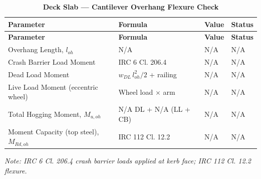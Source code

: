 \documentclass[12pt,a4paper]{report}
\numberwithin{table}{chapter}
\numberwithin{figure}{chapter}
\newcommand{\ReportTableSetup}{%
  \setlength{\tabcolsep}{3.0pt}%
  \renewcommand{\arraystretch}{1.18}%
  \setlength{\arrayrulewidth}{0.4pt}\setlength{\extrarowheight}{0.5pt}%
  \setlength{\LTleft}{\fill}\setlength{\LTright}{\fill}%
  \setlength{\LTpre}{4pt}\setlength{\LTpost}{8pt}}
\newcommand{\ReportTableFont}{\small}
\newcommand{\ReportRowGap}{3.0pt}
\newcommand{\ReportTableGap}{\vspace{0.5em}}
\begin{document}
\ReportTableGap
\begingroup
\ReportTableSetup
\ReportTableFont
\begin{longtable}{|L{5.5000cm}|C{3.5000cm}|>{\centering\arraybackslash}p{4.5000cm}|C{2.0000cm}|}
\caption{\textbf{Deck Slab --- Cantilever Overhang Flexure Check}}\\
\hline
\textbf{Parameter} & \textbf{Formula} & \textbf{Value} & \textbf{Status} \\[\ReportRowGap]
\hline
\endfirsthead
\hline
\textbf{Parameter} & \textbf{Formula} & \textbf{Value} & \textbf{Status} \\[\ReportRowGap]
\hline
\endhead
\hline
\endfoot
\hline
\endlastfoot

Overhang Length, $l_{oh}$ & N/A & N/A & N/A \\[\ReportRowGap]
\hline
Crash Barrier Load Moment & IRC 6 Cl. 206.4 & N/A & N/A \\[\ReportRowGap]
\hline
Dead Load Moment & $w_{DL}\,l_{oh}^2/2$ + railing & N/A & N/A \\[\ReportRowGap]
\hline
Live Load Moment (eccentric wheel) & Wheel load $\times$ arm & N/A & N/A \\[\ReportRowGap]
\hline
Total Hogging Moment, $M_{u,oh}$ & N/A DL + N/A (LL + CB) & N/A & N/A \\[\ReportRowGap]
\hline
Moment Capacity (top steel), $M_{Rd,oh}$ & IRC 112 Cl. 12.2 & N/A & N/A \\[\ReportRowGap]
\hline
\end{longtable}
\endgroup
\noindent\textit{Note: IRC 6 Cl. 206.4 crash barrier loads applied at kerb face; IRC 112 Cl. 12.2 flexure.}
\end{document}
